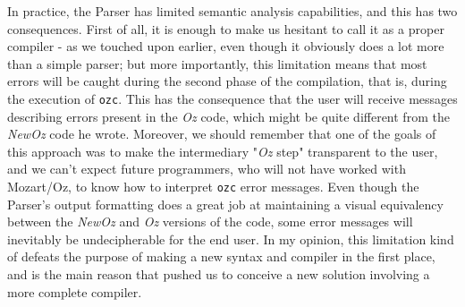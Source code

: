 In practice, the Parser has limited semantic analysis capabilities, and this has two consequences.
First of all, it is enough to make us hesitant to call it as a proper compiler - as we touched upon earlier, even though it obviously does a lot more than a simple parser;
but more importantly, this limitation means that most errors will be caught during the second phase of the compilation, that is, during the execution of \texttt{ozc}.
This has the consequence that the user will receive messages describing errors present in the \textit{Oz} code, which might be quite different from the \textit{NewOz} code he wrote.
Moreover, we should remember that one of the goals of this approach was to make the intermediary "\textit{Oz} step" transparent to the user, and we can't expect future programmers, who will not have worked with Mozart/Oz, to know how to interpret \texttt{ozc} error messages.
Even though the Parser's output formatting does a great job at maintaining a visual equivalency between the \textit{NewOz} and \textit{Oz} versions of the code, some error messages will inevitably be undecipherable for the end user.
In my opinion, this limitation kind of defeats the purpose of making a new syntax and compiler in the first place, and is the main reason that pushed us to conceive a new solution involving a more complete compiler.

